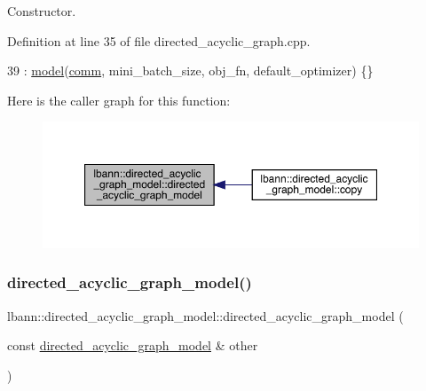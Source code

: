 Constructor. 

Definition at line 35 of file directed\+\_\+acyclic\+\_\+graph.\+cpp.


\begin{DoxyCode}
39   : \hyperlink{classlbann_1_1model_a6feaee921c434bbfc32451ed874cc051}{model}(\hyperlink{file__io_8cpp_ab048c6f9fcbcfaa57ce68b00263dbebe}{comm}, mini\_batch\_size, obj\_fn, default\_optimizer) \{\}
\end{DoxyCode}
Here is the caller graph for this function\+:\nopagebreak
\begin{figure}[H]
\begin{center}
\leavevmode
\includegraphics[width=350pt]{classlbann_1_1directed__acyclic__graph__model_a2b5f8058b341073a0a95d4882fb4ff52_icgraph}
\end{center}
\end{figure}
\mbox{\label{classlbann_1_1directed__acyclic__graph__model_a72966559db324ced94953b46a820d9d0}} 
\subsubsection{\texorpdfstring{directed\+\_\+acyclic\+\_\+graph\+\_\+model()}{directed\_acyclic\_graph\_model()}\hspace{0.1cm}{\footnotesize\ttfamily [2/2]}}
{\footnotesize\ttfamily lbann\+::directed\+\_\+acyclic\+\_\+graph\+\_\+model\+::directed\+\_\+acyclic\+\_\+graph\+\_\+model (\begin{DoxyParamCaption}\item[{const \hyperlink{classlbann_1_1directed__acyclic__graph__model}{directed\+\_\+acyclic\+\_\+graph\+\_\+model} \&}]{other }\end{DoxyParamCaption})\hspace{0.3cm}{\ttfamily [default]}}

